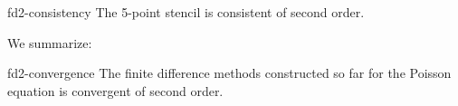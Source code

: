 \begin{Lemma}{fd2-consistency}
  The 5-point stencil is consistent of second order.
\end{Lemma}

We summarize:
\begin{Theorem}{fd2-convergence}
  The finite difference methods constructed so far for the Poisson
  equation is convergent of second order.
\end{Theorem}

